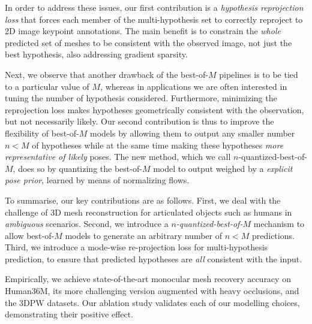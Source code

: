 In order to address these issues, our first contribution is a \emph{hypothesis reprojection loss} that forces each member of the multi-hypothesis set to correctly reproject to 2D image keypoint annotations.
The main benefit is to constrain the \emph{whole} predicted set of meshes to be consistent with the observed image, not just the best hypothesis, also addressing gradient sparsity.

Next, we observe that another drawback of the best-of-{$M$} pipelines is to be tied to a particular value of $M$, whereas in applications we are often interested in tuning the number of hypothesis considered.
Furthermore, minimizing the reprojection loss makes hypotheses geometrically consistent with the observation, but not necessarily likely.
Our second contribution is thus to improve the flexibility of best-of-$M$ models by allowing them to output any smaller number $n<M$ of hypotheses while at the same time making these hypotheses \emph{more representative of likely} poses.
The new method, which we call $n$-quantized-best-of-$M$, does so by quantizing the best-of-$M$ model to output weighed by a \emph{explicit pose prior}, learned by means of normalizing flows.




To summarise, our key contributions are as follows.
First, we deal with the challenge of 3D mesh reconstruction for articulated objects such as humans in \emph{ambiguous} scenarios.
Second, we introduce a \emph{$n$-quantized-best-of-$M$} mechanism to allow best-of-$M$ models to generate an arbitrary number of $n<M$ predictions.
Third, we introduce a mode-wise re-projection loss for multi-hypothesis prediction, to ensure that predicted hypotheses are \emph{all} consistent with the input.

Empirically, we achieve state-of-the-art monocular mesh recovery accuracy on Human36M, its more challenging version augmented with heavy occlusions, and the 3DPW datasets.
Our ablation study validates each of our modelling choices, demonstrating their positive effect.
